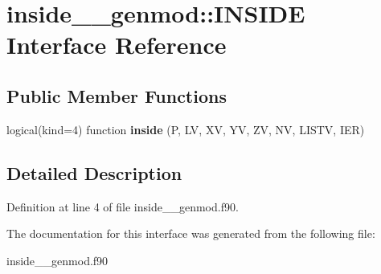 \hypertarget{interfaceinside____genmod_1_1_i_n_s_i_d_e}{\section{inside\+\_\+\+\_\+genmod\+:\+:I\+N\+S\+I\+D\+E Interface Reference}
\label{interfaceinside____genmod_1_1_i_n_s_i_d_e}
}
\subsection*{Public Member Functions}
\begin{DoxyCompactItemize}
\item 
\hypertarget{interfaceinside____genmod_1_1_i_n_s_i_d_e_a46324dff5f12c9184e7867f859f31297}{logical(kind=4) function {\bfseries inside} (P, L\+V, X\+V, Y\+V, Z\+V, N\+V, L\+I\+S\+T\+V, I\+E\+R)}\label{interfaceinside____genmod_1_1_i_n_s_i_d_e_a46324dff5f12c9184e7867f859f31297}

\end{DoxyCompactItemize}


\subsection{Detailed Description}


Definition at line 4 of file inside\+\_\+\+\_\+genmod.\+f90.



The documentation for this interface was generated from the following file\+:\begin{DoxyCompactItemize}
\item 
inside\+\_\+\+\_\+genmod.\+f90\end{DoxyCompactItemize}

